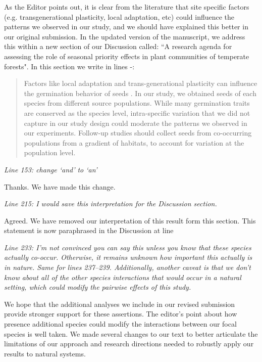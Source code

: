 \documentclass[11pt]{article}
\begin{document}
As the Editor points out, it is clear from the literature that site specific factors (e.g.  transgenerational plasticity, local adaptation, etc) could influence the patterns we observed in our study, and we should have explained this better in our original submission. In the updated version of the manuscript, we address this within a new section of our Discussion called: ``A research agenda for assessing the role of seasonal priority effects in plant communities of temperate forests". In this section we write in lines -:

\begin{quote}Factors like local adaptation and trans-generational plasticity can influence the germination behavior of seeds \citep{Donohue:2010uy,Baughman:2019ty}. In our study, we obtained seeds of each species from different source populations. While many germination traits are conserved as the species level, intra-specific variation that we did not capture in our study design could moderate the patterns we observed in our experiments. Follow-up studies should collect seeds from co-occurring populations from a gradient of habitats, to account for variation at the population level.\end{quote}

\emph{Line 153: change ‘and’ to ‘an’}

Thanks. We have made this change.

\emph{Line 215: I would save this interpretation for the Discussion section.}

Agreed. We have removed our interpretation of this result form this section. This statement is now paraphrased in the Discussion at line 

\emph{Line 233:  I’m not convinced you can say this unless you know that these species actually co-occur. Otherwise, it remains unknown how important this actually is in nature. Same for lines 237–239. Additionally, another caveat is that we don’t know about all of the other species interactions that would occur in a natural setting, which could modify the pairwise effects of this study.}

We hope that the additional analyses we include in our revised submission provide stronger support for these assertions. The editor's point about how presence additional species could modify the interactions between our focal species is well taken. We made several changes to our text to better articulate the limitations of our approach and research directions needed to robustly apply our results to natural systems.
\end{document}
